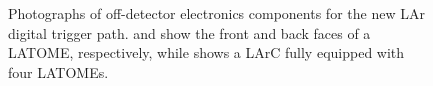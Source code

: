 \documentclass[cernpreprint, atlasdraft=false, UKenglish,british,orcidlogo, texmf, orcidlogo]{atlasdoc}
\begin{document}
\begin{figure}[t]
\begin{center}
 
\end{center}
\caption{Photographs of off-detector electronics components for the new \gls{LAr} digital trigger path.
\protect{} and \protect{} show the front and back faces of a \gls{LATOME}, respectively, while \protect{} shows a \gls{LArC} fully equipped with four \glspl{LATOME}.}
\label{fig:larLDPB}
\end{figure}
 
\end{document}
